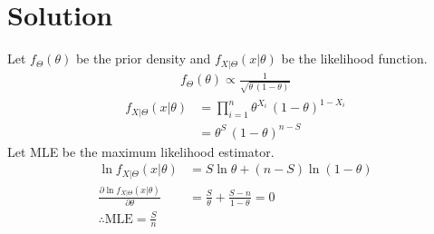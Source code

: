 \documentclass[journal,12pt,twocolumn]{IEEEtran}
\begin{document}
\section*{Solution}
Let $f_\Theta(\theta)$ be the prior density and $f_{X|\Theta}(x|\theta)$ be the likelihood function.
\begin{align}
    f_\Theta(\theta) \propto \frac{1}{\sqrt{\theta\,(1-\theta)}}
\end{align}
\begin{align}
    f_{X|\Theta}(x|\theta) &= \prod_{i=1}^n\theta^{X_i}\,(1-\theta)^{1-X_i}\nonumber\\ 
    &=\theta^S\,(1-\theta)^{n-S}
\end{align}
Let MLE be the maximum likelihood estimator.
\begin{align}
    \ln{f_{X|\Theta}(x|\theta)} &= S\ln{\theta} + (n-S)\ln{(1-\theta)}\\
    \frac{\partial \ln{f_{X|\Theta}(x|\theta)}}{\partial \theta} &= \frac{S}{\theta} + \frac{S-n}{1-\theta} = 0 \nonumber\\
     \therefore \text{MLE} = \frac{S}{n}
\end{align}
\end{document}
